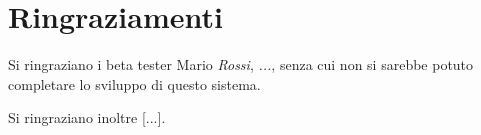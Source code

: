 \chapter*{Ringraziamenti}

Si ringraziano i beta tester {Mario \emph{Rossi}}, \textit{...}, senza cui non si sarebbe potuto completare lo sviluppo di questo sistema.

Si ringraziano inoltre [...].